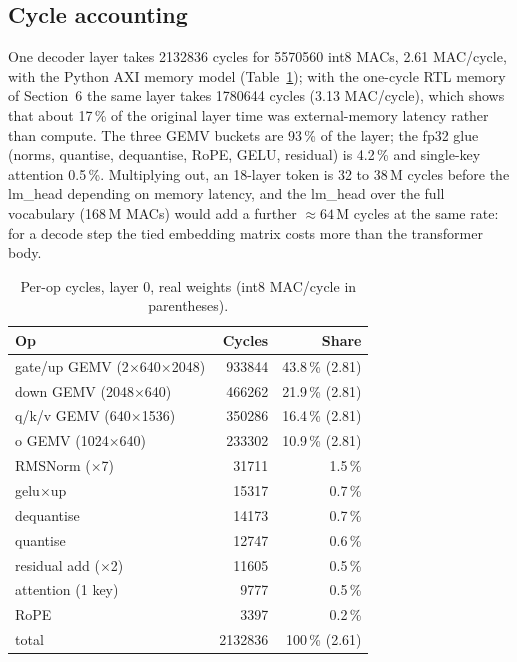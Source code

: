 \documentclass[10pt,twocolumn]{article}
\begin{document}
\subsection{Cycle accounting}
One decoder layer takes \num{2132836} cycles for \num{5570560} int8 MACs,
2.61 MAC/cycle, with the Python AXI memory model (Table~\ref{tab:cyc}); with
the one-cycle RTL memory of Section~6 the same layer takes \num{1780644}
cycles (3.13 MAC/cycle), which shows that about 17\,\% of the original
layer time was external-memory latency rather than compute. The three GEMV buckets are 93\,\% of the
layer; the fp32 glue (norms, quantise, dequantise, RoPE, GELU, residual) is
4.2\,\% and single-key attention 0.5\,\%. Multiplying out, an 18-layer token is
32 to 38\,M cycles before the lm\_head depending on memory latency, and the lm\_head over the full
vocabulary (168\,M MACs) would add a further $\approx 64$\,M cycles at the same
rate: for a decode step the tied embedding matrix costs more than the
transformer body.

\begin{table}[t]
\centering\small
\caption{Per-op cycles, layer 0, real weights (int8 MAC/cycle in
parentheses).}
\label{tab:cyc}
\begin{tabular}{lrr}
\toprule
Op & Cycles & Share \\
\midrule
gate/up GEMV (2$\times$640$\times$2048) & \num{933844} & 43.8\,\% (2.81) \\
down GEMV (2048$\times$640) & \num{466262} & 21.9\,\% (2.81) \\
q/k/v GEMV (640$\times$1536) & \num{350286} & 16.4\,\% (2.81) \\
o GEMV (1024$\times$640) & \num{233302} & 10.9\,\% (2.81) \\
RMSNorm ($\times$7) & \num{31711} & 1.5\,\% \\
gelu$\times$up & \num{15317} & 0.7\,\% \\
dequantise & \num{14173} & 0.7\,\% \\
quantise & \num{12747} & 0.6\,\% \\
residual add ($\times$2) & \num{11605} & 0.5\,\% \\
attention (1 key) & \num{9777} & 0.5\,\% \\
RoPE & \num{3397} & 0.2\,\% \\
\midrule
total & \num{2132836} & 100\,\% (2.61) \\
\bottomrule
\end{tabular}
\end{table}
\end{document}

